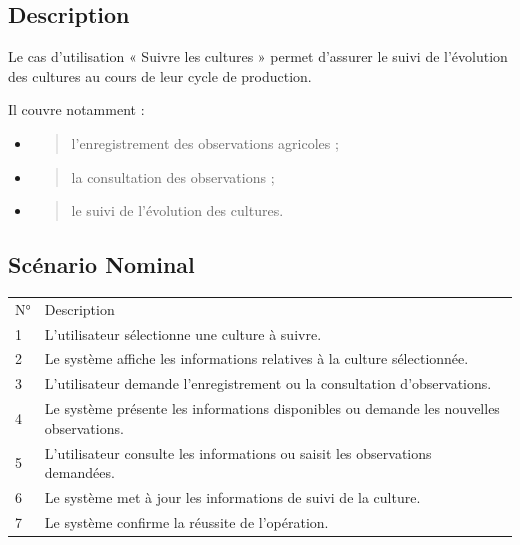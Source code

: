 \documentclass[
]{book}
\begin{document}
\hypertarget{description-1}{%
\subsection{Description}\label{description-1}}

Le cas d'utilisation « Suivre les cultures » permet d'assurer le suivi
de l'évolution des cultures au cours de leur cycle de production.

Il couvre notamment :

\begin{itemize}
\item
  \begin{quote}
  l'enregistrement des observations agricoles ;
  \end{quote}
\item
  \begin{quote}
  la consultation des observations ;
  \end{quote}
\item
  \begin{quote}
  le suivi de l'évolution des cultures.
  \end{quote}
\end{itemize}

\hypertarget{scuxe9nario-nominal-2}{%
\subsection{Scénario Nominal}\label{scuxe9nario-nominal-2}}

\begin{longtable}[]{@{}ll@{}}
\toprule
\endhead
N° & Description \\
1 & L'utilisateur sélectionne une culture à suivre. \\
2 & Le système affiche les informations relatives à la culture
sélectionnée. \\
3 & L'utilisateur demande l'enregistrement ou la consultation
d'observations. \\
4 & Le système présente les informations disponibles ou demande les
nouvelles observations. \\
5 & L'utilisateur consulte les informations ou saisit les observations
demandées. \\
6 & Le système met à jour les informations de suivi de la culture. \\
7 & Le système confirme la réussite de l'opération. \\
\bottomrule
\end{longtable}
\end{document}
